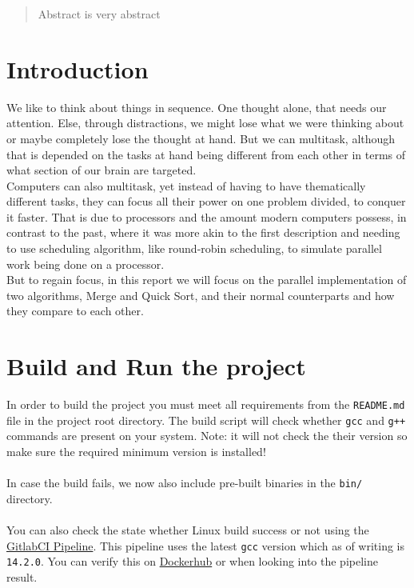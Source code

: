 \documentclass[twocolumn]{article}
\begin{document}


\begin{abstract}
    Abstract is very abstract
\end{abstract}


\section{Introduction}
We like to think about things in sequence. One thought alone, that needs our attention. Else, through distractions, we might lose what we were thinking about or maybe completely lose the thought at hand. But we can multitask, although that is depended on the tasks at hand being different from each other in terms of what section of our brain are targeted.\\
Computers can also multitask, yet instead of having to have thematically different tasks, they can focus all their power on one problem divided, to conquer it faster. That is due to processors and the amount modern computers possess, in contrast to the past, where it was more akin to the first description and needing to use scheduling algorithm, like round-robin scheduling, to simulate parallel work being done on a processor.\\
But to regain focus, in this report we will focus on the parallel implementation of two algorithms, Merge and Quick Sort, and their normal counterparts and how they compare to each other.


\section{Build and Run the project}
In order to build the project you must meet all requirements from the \texttt{README.md} file in the project root directory.
The build script will check whether \texttt{gcc} and \texttt{g++} commands are present on your system. 
Note: it will not check the their version so make sure the required minimum version is installed!\\
\\
In case the build fails, we now also include pre-built binaries in the \texttt{bin/} directory.\\
\\
You can also check the state whether Linux build success or not using the \href{https://gitlab.inf.uni-konstanz.de/ag-storandt/ae-24/koston.schwitz/-/pipelines}{GitlabCI Pipeline}. 
This pipeline uses the latest \texttt{gcc} version which as of writing is \texttt{14.2.0}. 
You can verify this on \href{https://hub.docker.com/_/gcc}{Dockerhub} or when looking into the pipeline result.
\end{document}
